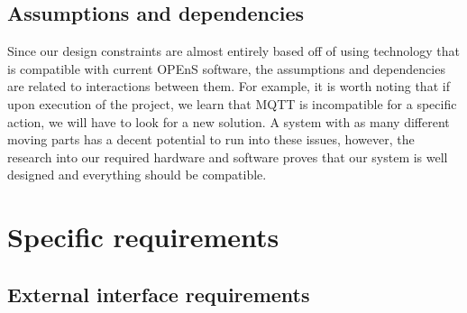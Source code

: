 \documentclass[onecolumn, draftclsnofoot,10pt, compsoc]{IEEEtran}
\begin{document}
	\subsection{Assumptions and dependencies}
    Since our design constraints are almost entirely based off of using technology that is compatible with current OPEnS software, the assumptions and dependencies are related to interactions between them. 
    For example, it is worth noting that if upon execution of the project, we learn that MQTT is incompatible for a specific action, we will have to look for a new solution. 
    A system with as many different moving parts has a decent potential to run into these issues, however, the research into our required hardware and software proves that our system is well designed and everything should be compatible. 

\section{Specific requirements}
	\subsection{External interface requirements}
\end{document}
